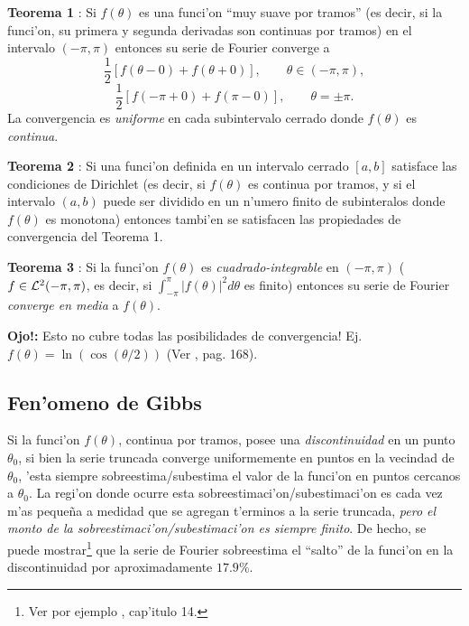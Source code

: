 \textbf{Teorema 1} \cite{Butkov}: Si $f(\theta)$ es una funci'on ``muy suave por tramos'' (es decir, si la funci'on, su primera y segunda derivadas son continuas por tramos) en el intervalo $(-\pi,\pi)$ entonces su serie de Fourier converge a
\begin{equation}
\frac{1}{2}\left[f(\theta-0)+f(\theta+0)\right], \qquad \theta\in (-\pi,\pi),
\end{equation}
\begin{equation}
\frac{1}{2}\left[f(-\pi+0)+f(\pi-0)\right], \qquad \theta=\pm\pi .
\end{equation}
La convergencia es \textit{uniforme} en cada subintervalo cerrado donde $f(\theta)$ es \textit{continua}.

\textbf{Teorema 2} \cite{Butkov}: Si una funci'on definida en un intervalo cerrado $[a,b]$ satisface las condiciones de Dirichlet (es decir, si $f(\theta)$ es continua por tramos, y si el intervalo $(a,b)$ puede ser dividido en un n'umero finito de subinteralos donde $f(\theta)$ es monotona) entonces tambi'en se satisfacen las propiedades de convergencia del Teorema 1.

\textbf{Teorema 3} \cite{Butkov}: Si la funci'on $f(\theta)$ es \textit{cuadrado-integrable} en $(-\pi,\pi)$ ($f\in {\cal L}^2(-\pi,\pi)$, es decir, si $\int_{-\pi}^\pi|f(\theta)|^2d\theta$ es finito) entonces su serie de Fourier \textit{converge en media} a $f(\theta)$.

\textbf{Ojo!:} Esto no cubre todas las posibilidades de convergencia! Ej. $f(\theta)=\ln(\cos(\theta/2))$ (Ver \cite{Butkov}, pag.  168).

\subsection{Fen'omeno de Gibbs}

Si la funci'on $f(\theta)$, continua por tramos, posee una \textit{discontinuidad} en un punto $\theta_0$, si bien la serie truncada converge uniformemente en puntos en la vecindad de $\theta_0$, 'esta siempre sobreestima/subestima el valor de la funci'on en puntos cercanos a $\theta_0$. La regi'on donde ocurre esta sobreestimaci'on/subestimaci'on es cada vez m'as peque\~na a medidad que se agregan t'erminos a la serie truncada, \textit{pero el monto de la sobreestimaci'on/subestimaci'on es siempre finito}. De hecho, se puede mostrar\footnote{Ver por ejemplo \cite{Arfken}, cap'itulo 14.} que la serie de Fourier sobreestima el ``salto'' de la funci'on en la discontinuidad por aproximadamente $17.9\%$.

